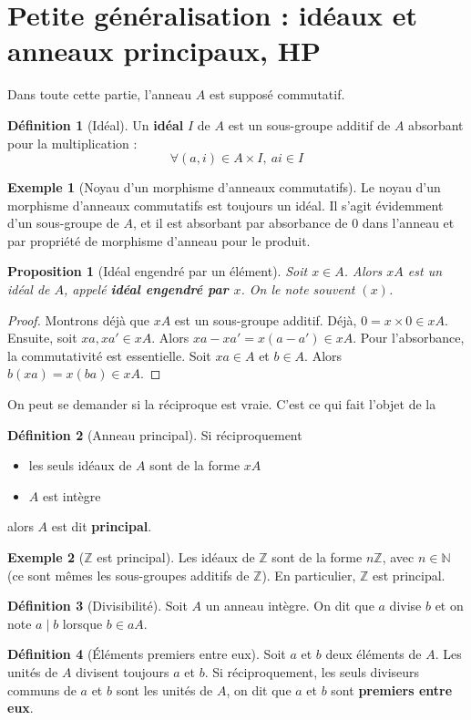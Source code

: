 \documentclass[french]{book}
\newcommand{\N}{\mathbb{N}}
\newcommand{\Z}{\mathbb{Z}}
\theoremstyle{plain}
\newtheorem{prop}{Proposition}[chapter]
\theoremstyle{definition}
\newtheorem{dfn}{Définition}[chapter]
\newtheorem{exa}{Exemple}[chapter]
\theoremstyle{remark}
\begin{document}
\section{Petite généralisation :  idéaux et anneaux principaux, HP}
Dans toute cette partie, l'anneau $A$ est supposé commutatif.
\begin{dfn}[Idéal]
	Un \textbf{idéal} $I$ de $A$ est un sous-groupe additif de $A$ absorbant pour la multiplication : $$\forall(a,i)\in A\times I,\ ai\in I$$
\end{dfn}
\begin{exa}[Noyau d'un morphisme d'anneaux commutatifs]
	Le noyau d'un morphisme d'anneaux commutatifs est toujours un idéal. Il s'agit évidemment d'un sous-groupe de $A$, et il est absorbant par absorbance de $0$ dans l'anneau et par propriété de morphisme d'anneau pour le produit.
\end{exa}
\begin{prop}[Idéal engendré par un élément]
	Soit $x\in A$. Alors $xA$ est un idéal de $A$, appelé \textbf{idéal engendré par $x$}. On le note souvent $(x)$.
\end{prop}
\begin{proof}
	Montrons déjà que $xA$ est un sous-groupe additif. Déjà, $0=x\times 0\in xA$. Ensuite, soit $xa,xa'\in xA$. Alors $xa-xa'=x(a-a')\in xA$. Pour l'absorbance, la commutativité est essentielle. Soit $xa\in A$ et $b\in A$. Alors $b(xa)=x(ba)\in xA$.
\end{proof}
On peut se demander si la réciproque est vraie. C'est ce qui fait l'objet de la
\begin{dfn}[Anneau principal]
	Si réciproquement
	\begin{itemize}
		\item les seuls idéaux de $A$ sont de la forme $xA$
		\item $A$ est intègre
	\end{itemize}
	alors $A$ est dit \textbf{principal}.
\end{dfn}
\begin{exa}[$\Z$ est principal]
	Les idéaux de $\Z$ sont de la forme $n\Z$, avec $n\in\N$ (ce sont mêmes les sous-groupes additifs de $\Z$). En particulier, $\Z$ est principal.
\end{exa}
\begin{dfn}[Divisibilité]
	Soit $A$ un anneau intègre. On dit que $a$ divise $b$ et on note $a\mid b$ lorsque $b\in aA$.
\end{dfn}
\begin{dfn}[Éléments premiers entre eux]
	Soit $a$ et $b$ deux éléments de $A$. Les unités de $A$ divisent toujours $a$ et $b$. Si réciproquement, les seuls diviseurs communs de $a$ et $b$ sont les unités de $A$, on dit que $a$ et $b$ sont \textbf{premiers entre eux}.
\end{dfn}
\end{document}

